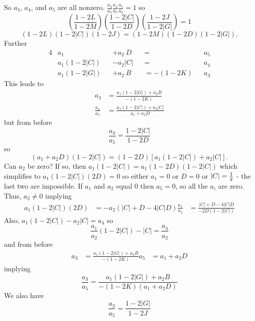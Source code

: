 So $a_3$, $a_4$, and $a_5$ are all nonzero.  $\frac{a_3}{a_4} \frac{a_4}{a_5}
\frac{a_5}{a_3} = 1$ so
\begin{equation*}
\left(\frac{1-2 L }{1-2 M }\right)
\left(\frac{1-2|C|}{1-2 D }\right)
\left(\frac{1-2 J }{1-2|G|}\right)
= 1
\end{equation*}
\begin{equation*}
(1-2L)(1-2|C|)(1-2J) = (1-2M)(1-2D)(1-2|G|).
\end{equation*}
Further
\begin{alignat*}{4}
&a_1          &&+ a_2 ~D  &&=         &&a_5 \\
&a_1 (1-2|C|) &&- a_2 |C| &&=         &&a_4 \\
&a_1 (1-2|G|) &&+ a_2 ~B  &&= -(1-2K) &&a_3
\end{alignat*}
This leads to
\begin{align}
a_3             &= \frac{a_1 (1-2|G|) + a_2  B }{-(1-2K)}     \\
\frac{a_4}{a_5} &= \frac{a_1 (1-2|C|) + a_2 |C|}{a_1 + a_2 D}
\end{align}
but from before
\begin{equation*}
\frac{a_4}{a_5} = \frac{1-2|C|}{1-2D}
\end{equation*}
so
\begin{equation*}
(a_1 + a_2 D)(1-2|C|) = (1-2D)[a_1 (1-2|C|) + a_2 |C|].
\end{equation*}
Can $a_2$ be zero?  If so, then $a_1(1-2|C|) = a_1(1-2D)(1-2|C|)$ which
simplifies to $a_1(1-2|C|)(2D) = 0$ so either $a_1 = 0$ or $D = 0$ or $|C| =
\frac{1}{2}$ - the last two are impossible.  If $a_1$ and $a_2$ equal 0 then
$a_5 = 0$, so all the $a_i$ are zero.  Thus, $a_2 \neq 0$ implying
\begin{align*}
a_1(1-2|C|)(2D) &= -a_2(|C|+D-4|C|D)
\frac{a_1}{a_2} &= \frac{|C|+D-4|C|D}{-2D(1-2|C|)}
\end{align*}
Also, $a_1(1-2|C|)-a_2|C| = a_4$ so
\begin{equation*}
\frac{a_1}{a_2}(1-2|C|) - |C| = \frac{a_4}{a_2}
\end{equation*}
and from before
\begin{align*}
a_3 &= \frac{a_1(1-2|G|) + a_2 B}{-(1-2K)}
a_5 &= a_1 + a_2 D
\end{align*}
implying
\begin{equation*}
\frac{a_3}{a_5} = \frac{a_1(1-2|G|) + a_2 B}{-(1-2K)(a_1 + a_2 D)}
\end{equation*}
We also have
\begin{equation*}
\frac{a_3}{a_5} = \frac{1-2|G|}{1-2J}
\end{equation*}

